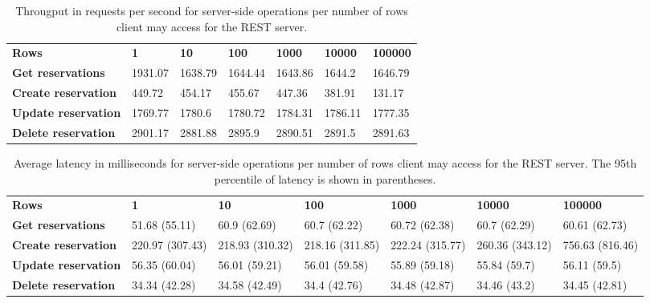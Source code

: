 
\begin{table}[H]
\centering
\begin{tabular}{lllllll}
\textbf{Rows} & \textbf{1} & \textbf{10} & \textbf{100} & \textbf{1000} & \textbf{10000} & \textbf{100000} \\
\textbf{Get reservations} & 1931.07 & 1638.79 & 1644.44 & 1643.86 & 1644.2 & 1646.79\\
\textbf{Create reservation} & 449.72 & 454.17 & 455.67 & 447.36 & 381.91 & 131.17\\
\textbf{Update reservation} & 1769.77 & 1780.6 & 1780.72 & 1784.31 & 1786.11 & 1777.35\\
\textbf{Delete reservation} & 2901.17 & 2881.88 & 2895.9 & 2890.51 & 2891.5 & 2891.63
\end{tabular}
\caption{Througput in requests per second for server-side operations per number of rows client may access for the REST server.}
\label{tab:server-rest-experiment}
\end{table}

\begin{table}[H]
\centering
\begin{adjustbox}{width=\textwidth}
\begin{tabular}{lllllll}
\textbf{Rows} & \textbf{1} & \textbf{10} & \textbf{100} & \textbf{1000} & \textbf{10000} & \textbf{100000} \\
\textbf{Get reservations} & 51.68 (55.11) & 60.9 (62.69) & 60.7 (62.22) & 60.72 (62.38) & 60.7 (62.29) & 60.61 (62.73)\\
\textbf{Create reservation} & 220.97 (307.43) & 218.93 (310.32) & 218.16 (311.85) & 222.24 (315.77) & 260.36 (343.12) & 756.63 (816.46)\\
\textbf{Update reservation} & 56.35 (60.04) & 56.01 (59.21) & 56.01 (59.58) & 55.89 (59.18) & 55.84 (59.7) & 56.11 (59.5)\\
\textbf{Delete reservation} & 34.34 (42.28) & 34.58 (42.49) & 34.4 (42.76) & 34.48 (42.87) & 34.46 (43.2) & 34.45 (42.81)
\end{tabular}
\end{adjustbox}
\caption{Average latency in milliseconds for server-side operations per number of rows client may access for the REST server. The 95th percentile of latency is shown in parentheses.}
\label{tab:server-rest-experiment-latency}
\end{table}

